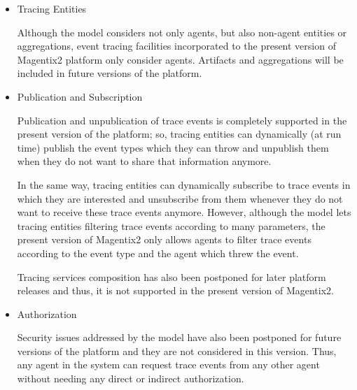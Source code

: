 		\begin{itemize}

		\item{Tracing Entities}

			Although the model considers not only agents, but also non-agent entities or aggregations,
			event tracing facilities incorporated to the present version of Magentix2 platform only
			consider agents. Artifacts and aggregations will be included in future versions of the
			platform.

		\item{Publication and Subscription}

			Publication and unpublication of trace events is completely supported in the present version
			of the platform; so, tracing entities can dynamically (at run time) publish the event types
			which they can throw and unpublish them when they do not want to share that information
			anymore.

			In the same way, tracing entities can dynamically subscribe to trace events in which they are
			interested and unsubscribe from them whenever they do not want to receive these trace
			events anymore. However, although the model lets tracing entities filtering trace events
			according to many parameters, the present version of Magentix2 only allows agents to filter
			trace events according to the event type and the agent which threw the event.

			Tracing services composition has also been postponed for later platform releases and thus,
			it is not supported in the present version of Magentix2.

		\item{Authorization}

			Security issues addressed by the model have also been postponed for future versions of the
			platform and they are not considered in this version. Thus, any agent in the system can
			request trace events from any other agent without needing any direct or indirect
			authorization.

		\end{itemize}


